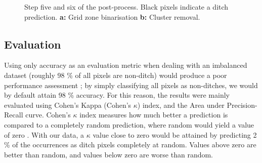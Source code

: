 \documentclass[11pt, review]{elsarticle} %
\providecommand{\DIFaddendFL}{} %
\begin{document}
\begin{figure} [!htb]
{        }
    \DIFaddendFL \caption{Step five and six of the post-process. Black pixels indicate a ditch prediction. \textbf{a: }Grid zone binarisation \textbf{b: }Cluster removal.}
    \label{fig:postprocessing3}
\end{figure}

\subsection{Evaluation} \label{evaluation}

Using only accuracy as an evaluation metric when dealing with an imbalanced dataset (roughly 98 \% of all pixels are non-ditch) would produce a poor performance assessment \citep{balanced}; by simply classifying all pixels as non-ditches, we would by default attain 98 \% accuracy. For this reason, the results were mainly evaluated using Cohen's Kappa (Cohen's $\kappa$) index, and the Area under Precision-Recall curve. Cohen's $\kappa$ index measures how much better a prediction is compared to a completely random prediction, where random would yield a value of zero \citep{kappa123}. With our data, a $\kappa$ value close to zero would be attained by predicting 2 \% of the occurrences as ditch pixels completely at random. Values above zero are better than random, and values below zero are worse than random.
\end{document}
